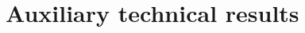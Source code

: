 \documentclass[11pt,a4paper]{article}
\newcommand{\expect}[0]{\mathbf{E}}
\theoremstyle{plain}
\numberwithin{equation}{section}
\begin{document}
\appendix
\section{Auxiliary technical results}%
\label{sec:auxiliary_technical_results}
\end{document}
